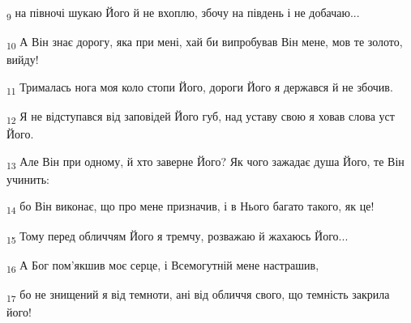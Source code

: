 \begin{tcolorbox}
\textsubscript{9} на півночі шукаю Його й не вхоплю, збочу на південь і не добачаю...
\end{tcolorbox}
\begin{tcolorbox}
\textsubscript{10} А Він знає дорогу, яка при мені, хай би випробував Він мене, мов те золото, вийду!
\end{tcolorbox}
\begin{tcolorbox}
\textsubscript{11} Трималась нога моя коло стопи Його, дороги Його я держався й не збочив.
\end{tcolorbox}
\begin{tcolorbox}
\textsubscript{12} Я не відступався від заповідей Його губ, над уставу свою я ховав слова уст Його.
\end{tcolorbox}
\begin{tcolorbox}
\textsubscript{13} Але Він при одному, й хто заверне Його? Як чого зажадає душа Його, те Він учинить:
\end{tcolorbox}
\begin{tcolorbox}
\textsubscript{14} бо Він виконає, що про мене призначив, і в Нього багато такого, як це!
\end{tcolorbox}
\begin{tcolorbox}
\textsubscript{15} Тому перед обличчям Його я тремчу, розважаю й жахаюсь Його...
\end{tcolorbox}
\begin{tcolorbox}
\textsubscript{16} А Бог пом'якшив моє серце, і Всемогутній мене настрашив,
\end{tcolorbox}
\begin{tcolorbox}
\textsubscript{17} бо не знищений я від темноти, ані від обличчя свого, що темність закрила його!
\end{tcolorbox}
